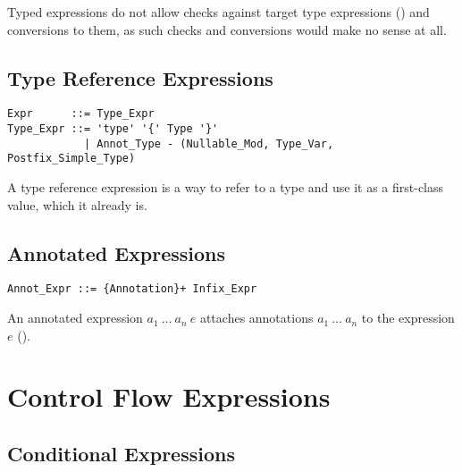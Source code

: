 Typed expressions do not allow checks against target type expressions () and conversions to them, as such checks and conversions would make no sense at all. 





\subsection{Type Reference Expressions}
\label{sec:type-ref-expressions}

\syntax\begin{lstlisting}
Expr      ::= Type_Expr
Type_Expr ::= 'type' '{' Type '}'
            | Annot_Type - (Nullable_Mod, Type_Var, Postfix_Simple_Type)
\end{lstlisting}

A type reference expression is a way to refer to a type and use it as a first-class value, which it already is. 






\subsection{Annotated Expressions}
\label{sec:annotated-exprs}

\syntax\begin{lstlisting}
Annot_Expr ::= {Annotation}+ Infix_Expr
\end{lstlisting}

An annotated expression $a_1\ \ldots\ a_n\ e$ attaches annotations $a_1\ \ldots\ a_n$ to the expression $e$ (). 





\section{Control Flow Expressions}





\subsection{Conditional Expressions}
\label{sec:conditional-expressions}

